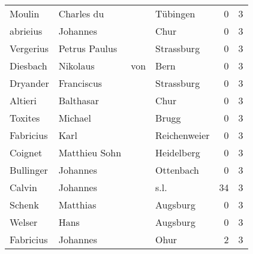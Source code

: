 \begin{center}
\begin{tiny}
\begin{longtabu}{llllrr}
                   Moulin &                         Charles du &             &                                    Tübingen &          0 &         3 \\
                 abrieius &                           Johannes &             &                                        Chur &          0 &         3 \\
                Vergerius &                      Petrus Paulus &             &                                  Strassburg &          0 &         3 \\
                 Diesbach &                           Nikolaus &         von &                                        Bern &          0 &         3 \\
                 Dryander &                         Franciscus &             &                                  Strassburg &          0 &         3 \\
                  Altieri &                          Balthasar &             &                                        Chur &          0 &         3 \\
                  Toxites &                            Michael &             &                                       Brugg &          0 &         3 \\
                Fabricius &                               Karl &             &                                Reichenweier &          0 &         3 \\
                  Coignet &                      Matthieu Sohn &             &                                  Heidelberg &          0 &         3 \\
                Bullinger &                           Johannes &             &                                   Ottenbach &          0 &         3 \\
                   Calvin &                           Johannes &             &                                        s.l. &         34 &         3 \\
                   Schenk &                           Matthias &             &                                    Augsburg &          0 &         3 \\
                   Welser &                               Hans &             &                                    Augsburg &          0 &         3 \\
                Fabricius &                           Johannes &             &                                        Ohur &          2 &         3 \\

\end{longtabu}
\end{tiny}
\end{center}
